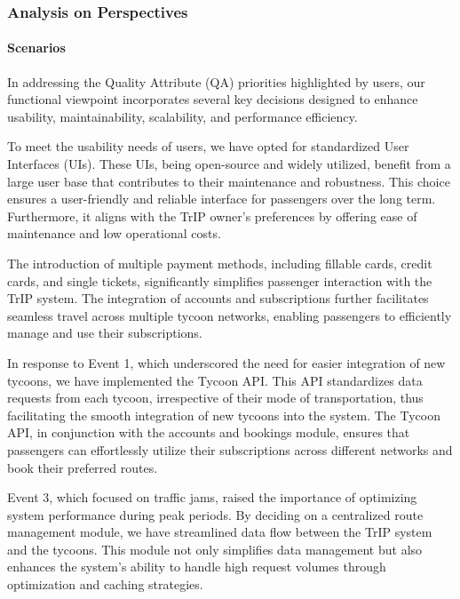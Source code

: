 \subsubsection{Analysis on Perspectives}


\paragraph{Scenarios}


In addressing the Quality Attribute (QA) priorities highlighted by users, our functional viewpoint incorporates several key decisions designed to enhance usability, maintainability, scalability, and performance efficiency.

To meet the usability needs of users, we have opted for standardized User Interfaces (UIs). These UIs, being open-source and widely utilized, benefit from a large user base that contributes to their maintenance and robustness. This choice ensures a user-friendly and reliable interface for passengers over the long term. Furthermore, it aligns with the TrIP owner's preferences by offering ease of maintenance and low operational costs.

The introduction of multiple payment methods, including fillable cards, credit cards, and single tickets, significantly simplifies passenger interaction with the TrIP system. The integration of accounts and subscriptions further facilitates seamless travel across multiple tycoon networks, enabling passengers to efficiently manage and use their subscriptions.

In response to Event 1, which underscored the need for easier integration of new tycoons, we have implemented the Tycoon API. This API standardizes data requests from each tycoon, irrespective of their mode of transportation, thus facilitating the smooth integration of new tycoons into the system. The Tycoon API, in conjunction with the accounts and bookings module, ensures that passengers can effortlessly utilize their subscriptions across different networks and book their preferred routes.

Event 3, which focused on traffic jams, raised the importance of optimizing system performance during peak periods. By deciding on a centralized route management module, we have streamlined data flow between the TrIP system and the tycoons. This module not only simplifies data management but also enhances the system's ability to handle high request volumes through optimization and caching strategies.

